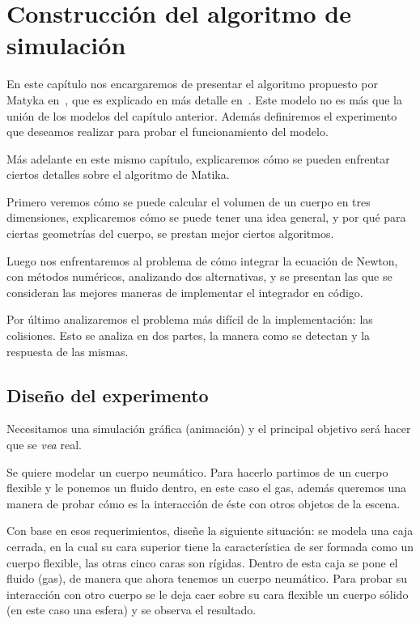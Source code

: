 \chapter{Construcción del algoritmo de simulación}

En este capítulo nos encargaremos de presentar el algoritmo propuesto por Matyka en~\cite{Matyka:Presion}, que es explicado en más detalle en~\cite{Matika:SoftBody}.
Este modelo no es más que la unión de los modelos del capítulo anterior.
Además definiremos el experimento que deseamos realizar para probar el funcionamiento del modelo.

Más adelante en este mismo capítulo, explicaremos cómo se pueden enfrentar ciertos detalles sobre el algoritmo de Matika.

Primero veremos cómo se puede calcular el volumen de un cuerpo en tres dimensiones, explicaremos cómo se puede tener una idea general, y por qué para ciertas geometrías del cuerpo, se prestan mejor ciertos algoritmos.

Luego nos enfrentaremos al problema de cómo integrar la ecuación de Newton, con métodos numéricos, analizando dos alternativas, y se presentan las que se consideran las mejores maneras de implementar el integrador en código.

Por último analizaremos el problema más difícil de la implementación: las colisiones.
Esto se analiza en dos partes, la manera como se detectan y la respuesta de las mismas.

\section{Diseño del experimento}
\label{descripcion:experimento}
Necesitamos una simulación gráfica (animación) y el principal objetivo será hacer que se \emph{vea} real.

Se quiere modelar un cuerpo neumático.
Para hacerlo partimos de un cuerpo flexible y le ponemos un fluido dentro, en este caso el gas, además queremos una manera de probar cómo es la interacción de éste con otros objetos de la escena. 

Con base en esos requerimientos, diseñe la siguiente situación: se modela una caja cerrada, en la cual su cara superior tiene la característica de ser formada como un cuerpo flexible, las otras cinco caras son rígidas.
Dentro de esta caja se pone el fluido (gas), de manera que ahora tenemos un cuerpo neumático.
Para probar su interacción con otro cuerpo se le deja caer sobre su cara flexible un cuerpo sólido (en este caso una esfera) y se observa el resultado.

